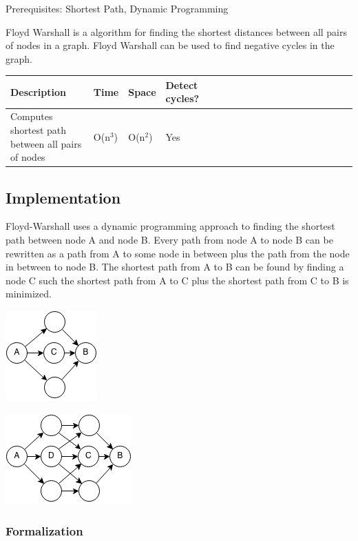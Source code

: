 \documentclass[11pt,oneside]{book}
\makeatletter
\def\maxwidth#1{\ifdim\Gin@nat@width>#1 #1\else\Gin@nat@width\fi}
\makeatother
\begin{document}
Prerequisites:  Shortest Path, Dynamic Programming

Floyd Warshall is a algorithm for finding the shortest distances between all pairs of nodes in a graph. Floyd Warshall can be used to find negative cycles in the graph.

\vspace{10pt} \begin{tabular}{|l|l|l|l|l|l|l|l|l|l|l|l|l|l|l|l|l|l|l}\hline


  Description &
  Time &
  Space &
  Detect cycles?\\
\hline


  Computes shortest path between all pairs of nodes &
  O(n$^{3}$) &
  O(n$^{2}$) &
  Yes\\

\hline\end{tabular}

\subsection{Implementation}

Floyd-Warshall uses a dynamic programming approach to finding the shortest path between node A and node B. Every path from node A to node B can be rewritten as a path from A to some node in between plus the path from the node in between to node B. The shortest path from A to B can be found by finding a node C such the shortest path from A to C plus the shortest path from C to B is minimized.

\includegraphics[width=\maxwidth{\textwidth}]{floydwarshall1.png}

\includegraphics[width=\maxwidth{\textwidth}]{floydwarshall.png}

\subsubsection{Formalization}
\end{document}
